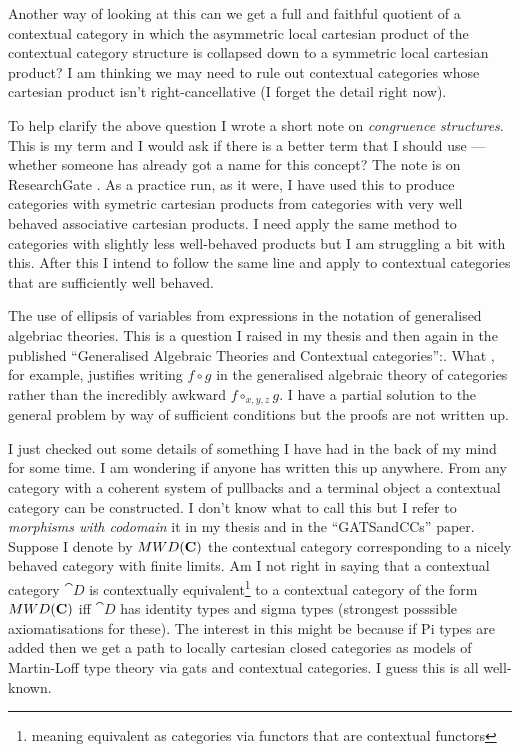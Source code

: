 \documentclass[10pt,a4paper]{article}
\theoremstyle{remark}
\begin{document}
\note Another way of looking at this can we get a full and faithful quotient of a contextual category
in which the asymmetric local cartesian product of the contextual category structure is collapsed down to a symmetric local cartesian product? I am thinking we may need to rule out contextual categories whose 
cartesian product isn't right-cancellative (I forget the detail right now). 

\note
To help clarify the above question I wrote a short note on \textit{congruence structures}.  This is my term and I would ask if there is a better term that I should use --- whether someone has already got a  name for this concept? The note is on ResearchGate \cite{CartmellCongruenceStructure}. 
As a practice run, as it were, I have used this to produce categories with symetric cartesian products from categories with very well behaved associative cartesian products. I need apply the same method to categories with slightly less well-behaved products but I am struggling a bit with this. After this I intend to follow the same line and apply to contextual categories that are sufficiently well behaved.

\note
The use of ellipsis of variables from expressions in the notation of generalised algebriac theories. 
This is a question I raised in my thesis 
and then again in the published ``Generalised Algebraic Theories and Contextual categories'':. 
What , for example, justifies writing $f \circ g$ in the generalised algebraic theory of categories rather than the incredibly awkward $f \circ_{x,y,z} g$. 
I have a partial solution to the general problem by way of sufficient conditions but the proofs are not written up. 

\note 
I just checked out some details of something I have had in the back of my mind for some time. I am wondering if anyone has written this up anywhere. From any category with a coherent system of pullbacks and a terminal object a contextual category can be constructed. I don't know what to call this but 
I refer to \textit{morphisms with codomain} it in my thesis and in the ``GATSandCCs'' paper.
Suppose I denote by $MWD(\textbf{C})$ the contextual category corresponding to a nicely behaved category \catcw with finite limits. Am I not right in saying that a contextual category $\cat{D}$ is contextually equivalent\footnote{meaning equivalent as categories via functors that are contextual functors} to 
a contextual category of the form $MWD(\textbf{C})$ iff $\cat{D}$ has identity types and sigma types
(strongest posssible axiomatisations for these). The interest in this might be because if Pi types are added then we get  a path to locally cartesian closed categories as models of Martin-Loff type theory via gats and contextual categories. I guess this is all well-known.
\end{document}
